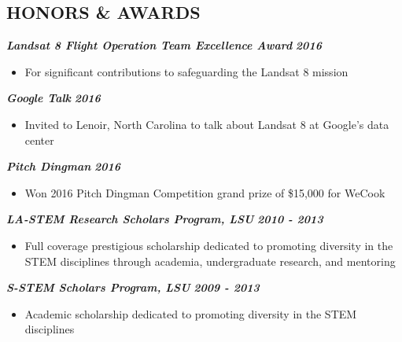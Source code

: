 \documentclass{res}
\begin{document}
\begin{resume}
\section{HONORS \& AWARDS}
  	{\bfseries {\em Landsat 8 Flight Operation Team Excellence Award}} \hfill {\bfseries {\em 2016}} \
		\begin{itemize} \itemsep -2pt %
		\item For significant contributions to safeguarding the Landsat 8 mission
		\end{itemize}
	{\bfseries {\em Google Talk}} \hfill {\bfseries {\em 2016}} \
		\begin{itemize} \itemsep -2pt %
		\item Invited to Lenoir, North Carolina to talk about Landsat 8 at Google's data center
		\end{itemize}
	{\bfseries {\em Pitch Dingman}} \hfill {\bfseries {\em 2016}} \
		\begin{itemize} \itemsep -2pt %
		\item Won 2016 Pitch Dingman Competition grand prize of \$15,000 for WeCook
		\end{itemize}
  	{\bfseries {\em LA-STEM Research Scholars Program, LSU}} \hfill {\bfseries {\em 2010 - 2013}} \
		\begin{itemize} \itemsep -2pt %
		\item Full coverage prestigious scholarship dedicated to promoting diversity in the STEM disciplines through academia, undergraduate research, and mentoring
		\end{itemize}
	{\bfseries {\em S-STEM Scholars Program, LSU}} \hfill {\bfseries {\em 2009 - 2013}} \
		\begin{itemize} \itemsep -2pt %
		\item Academic scholarship dedicated to promoting diversity in the STEM disciplines
		\end{itemize}


\end{resume}
\end{document}
